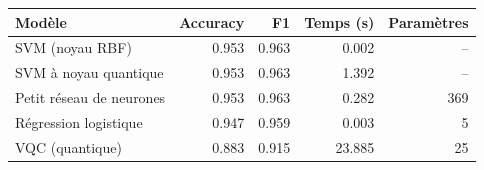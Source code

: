 \begin{tabular}{lrrrr}
\toprule
Modèle & Accuracy & F1 & Temps (s) & Paramètres \\
\midrule
SVM (noyau RBF) & 0.953 & 0.963 & 0.002 & -- \\
SVM à noyau quantique & 0.953 & 0.963 & 1.392 & -- \\
Petit réseau de neurones & 0.953 & 0.963 & 0.282 & 369 \\
Régression logistique & 0.947 & 0.959 & 0.003 & 5 \\
VQC (quantique) & 0.883 & 0.915 & 23.885 & 25 \\
\bottomrule
\end{tabular}

